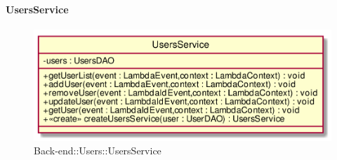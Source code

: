 \hypertarget{UsersService_label}{\paragraph{UsersService}}
\begin{figure}[h]
	\centering
	\includegraphics[width=\textwidth,height=\textheight,keepaspectratio]{images/ClassUsersService.png}
	\caption{Back-end::Users::UsersService}
\end{figure}

